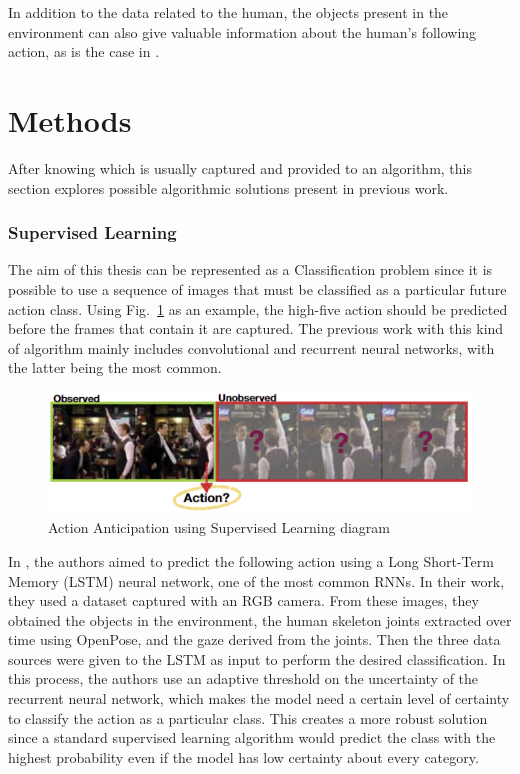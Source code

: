 In addition to the data related to the human, the objects present in the environment can also give valuable information about the human's following action, as is the case in \cite{Furnari2021}.

\section{Methods}

After knowing which is usually captured and provided to an algorithm, this section explores possible algorithmic solutions present in previous work.

\subsubsection{Supervised Learning}

The aim of this thesis can be represented as a Classification problem since it is possible to use a sequence of images that must be classified as a particular future action class. Using Fig.~\ref{superviseddiagram} as an example, the high-five action should be predicted before the frames that contain it are captured. The previous work with this kind of algorithm mainly includes convolutional and recurrent neural networks, with the latter being the most common.

\begin{figure}[H]
\centerline{\includegraphics[width=6in]{figs/superviseddiagram.PNG}}
\caption{Action Anticipation using Supervised Learning diagram\cite{Gammulle2019}}
\label{superviseddiagram}
\end{figure}

In \cite{Canuto2021}, the authors aimed to predict the following action using a Long Short-Term Memory (LSTM) neural network, one of the most common RNNs. In their work, they used a dataset captured with an RGB camera. From these images, they obtained the objects in the environment, the human skeleton joints extracted over time using OpenPose, and the gaze derived from the joints. Then the three data sources were given to the LSTM as input to perform the desired classification. In this process, the authors use an adaptive threshold on the uncertainty of the recurrent neural network, which makes the model need a certain level of certainty to classify the action as a particular class. This creates a more robust solution since a standard supervised learning algorithm would predict the class with the highest probability even if the model has low certainty about every category.

